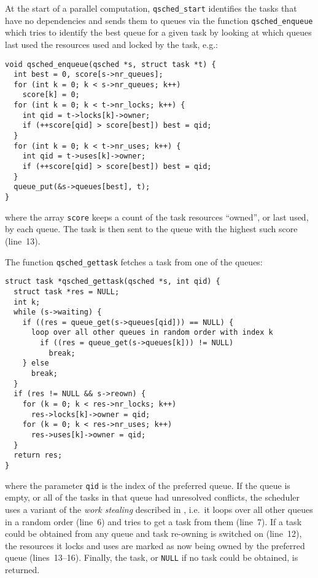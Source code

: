 \documentclass[preprint]{elsarticle}
\begin{document}
At the start of a parallel computation, {\tt qsched\_start}
identifies the tasks that have no dependencies and sends them
to queues via the function {\tt qsched\_enqueue} which
tries to identify the best
queue for a given task by looking at which queues last used
the resources used and locked by the task, e.g.:
\begin{center}\begin{minipage}{0.9\textwidth}
    \begin{lstlisting}
void qsched_enqueue(qsched *s, struct task *t) {
  int best = 0, score[s->nr_queues];
  for (int k = 0; k < s->nr_queues; k++)
    score[k] = 0;
  for (int k = 0; k < t->nr_locks; k++) {
    int qid = t->locks[k]->owner;
    if (++score[qid] > score[best]) best = qid;
  }
  for (int k = 0; k < t->nr_uses; k++) {
    int qid = t->uses[k]->owner;
    if (++score[qid] > score[best]) best = qid;
  }
  queue_put(&s->queues[best], t);
}
    \end{lstlisting}
\end{minipage}\end{center}
\noindent where the array {\tt score} keeps a count of the
task resources ``owned'', or last used, by each queue.
The task is then sent to the queue with the highest such score
(line~13).

The function {\tt qsched\_gettask} fetches a task from
one of the queues:
\begin{center}\begin{minipage}{0.9\textwidth}
    \begin{lstlisting}
struct task *qsched_gettask(qsched *s, int qid) {
  struct task *res = NULL;
  int k;
  while (s->waiting) {
    if ((res = queue_get(s->queues[qid])) == NULL) {
      loop over all other queues in random order with index k
        if ((res = queue_get(s->queues[k])) != NULL)
          break;
    } else
      break;
  }
  if (res != NULL && s->reown) {
    for (k = 0; k < res->nr_locks; k++)
      res->locks[k]->owner = qid;
    for (k = 0; k < res->nr_uses; k++)
      res->uses[k]->owner = qid;
  }
  return res;
}
    \end{lstlisting}
\end{minipage}\end{center}
\noindent where the parameter {\tt qid} is the index of the
preferred queue.
If the queue is empty, or all of the tasks in that queue had
unresolved conflicts, the scheduler uses a variant of the
{\em work stealing} described in \cite{ref:Blumofe1999},
i.e.~it loops over all other queues
in a random order (line~6) and tries to get a task from them
(line~7).
If a task could be obtained from any queue and task re-owning
is switched on (line~12),
the resources it locks and uses are marked as now being owned
by the preferred queue (lines~13--16).
Finally, the task, or {\tt NULL} if no task could be obtained,
is returned.
\end{document}
